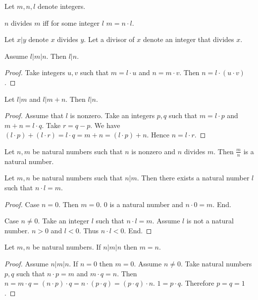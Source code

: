 \documentclass{article}
\begin{document}
\begin{forthel}
Let $m,n,l$ denote integers.

\begin{definition}
$n$ divides $m$ iff for some integer $l$ $m = n \cdot l$.
\end{definition}

Let $x | y$ denote $x$ divides $y$.
Let a divisor of $x$ denote an integer that divides $x$.

\begin{lemma}
Assume $l | m | n$.
Then $l | n$.
\end{lemma}
\begin{proof}
Take integers $u,v$ such that
$m = l \cdot u$ and $n = m \cdot v$.
Then $n = l \cdot (u \cdot v)$.
\end{proof}

\begin{lemma}
Let $l | m$ and $l | m + n$.
Then $l | n$.
\end{lemma}
\begin{proof}
Assume that $l$ is nonzero.
Take an integers $p,q$ such that $m = l \cdot p$ and $m + n = l \cdot q$.
Take $r = q - p$.
We have
$(l \cdot p) + (l \cdot r) = l \cdot q = m + n = (l \cdot p) + n$.
Hence $n = l \cdot r$.
\end{proof}

\begin{lemma}
Let $n,m$ be natural numbers such that $n$ is nonzero and $n$ divides $m$.
Then $\frac{m}{n}$ is a natural number.
\end{lemma}

\begin{lemma}
Let $m,n$ be natural numbers such that $n | m$.
Then there exists a natural number $l$ such that $n \cdot l = m$.
\end{lemma}
\begin{proof}
Case $n = 0$. Then $m = 0$. $0$ is a natural number and $n \cdot 0 = m$. End.

Case $n \neq 0$.
Take an integer $l$ such that $n \cdot l = m$.
Assume $l$ is not a natural number.
$n > 0$ and $l < 0$. Thus $n \cdot l < 0$. End.
\end{proof}

\begin{lemma}
Let $m,n$ be natural numbers.
If $n | m | n$ then $m=n$.
\end{lemma}
\begin{proof}
Assume $n | m | n$.
If $n = 0$ then $m = 0$. Assume $n \neq 0$.
Take natural numbers $p,q$ such that $n \cdot p = m$ and $m \cdot q = n$.
Then $n = m \cdot q = (n \cdot p) \cdot q = n \cdot (p \cdot q) = (p \cdot q) \cdot n$. $1 = p \cdot q$. Therefore $p=q=1$.
\end{proof}


\end{forthel}
\end{document}
